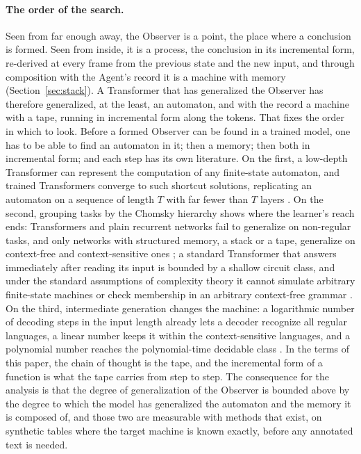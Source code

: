 \paragraph{The order of the search.}
Seen from far enough away, the Observer is a point, the place where a conclusion is formed. Seen from
inside, it is a process, the conclusion in its incremental form, re-derived at every frame from the
previous state and the new input, and through composition with the Agent's record it is a machine with
memory (Section~\ref{sec:stack}). A Transformer that has generalized the Observer has therefore
generalized, at the least, an automaton, and with the record a machine with a tape, running in
incremental form along the tokens. That fixes the order in which to look. Before a formed Observer can
be found in a trained model, one has to be able to find an automaton in it; then a memory; then both in
incremental form; and each step has its own literature. On the first, a low-depth Transformer can
represent the computation of any finite-state automaton, and trained Transformers converge to such
shortcut solutions, replicating an automaton on a sequence of length $T$ with far fewer than $T$
layers \citep{liu2023auto}. On the second, grouping tasks by the Chomsky hierarchy shows where the
learner's reach ends: Transformers and plain recurrent networks fail to generalize on non-regular
tasks, and only networks with structured memory, a stack or a tape, generalize on context-free and
context-sensitive ones \citep{deletang2022}; a standard Transformer that answers immediately after
reading its input is bounded by a shallow circuit class, and under the standard assumptions of
complexity theory it cannot simulate arbitrary finite-state machines or check membership in an
arbitrary context-free grammar \citep{merrill2023,merrill2024}. On the third, intermediate generation changes the machine: a logarithmic number
of decoding steps in the input length already lets a decoder recognize all regular languages, a linear
number keeps it within the context-sensitive languages, and a polynomial number reaches the
polynomial-time decidable class \citep{merrill2024}. In the terms of this paper, the chain of thought
is the tape, and the incremental form of a function is what the tape carries from step to step. The
consequence for the analysis is that the degree of generalization of the Observer is bounded above by
the degree to which the model has generalized the automaton and the memory it is composed of, and
those two are measurable with methods that exist, on synthetic tables where the target machine is
known exactly, before any annotated text is needed.

